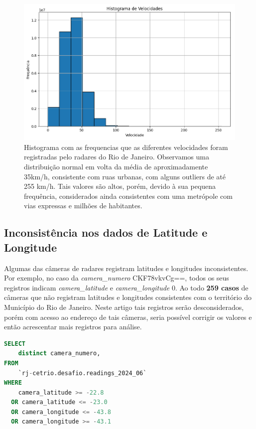 \documentclass{article}
\begin{document}
\begin{figure}
    \centering
    \includegraphics[width=0.75\linewidth]{histVelocidades.png}
    \caption{Histograma com as frequencias que as diferentes velocidades foram registradas pelo radares do Rio de Janeiro. Observamos uma distribuição normal em volta da média de aproximadamente 35km/h, consistente com ruas urbanas, com alguns outliers de até 255 km/h. Tais valores são altos, porém, devido à sua pequena frequência, considerados ainda consistentes com uma metrópole com vias expressas e milhões de habitantes.}
    \label{fig:histVelocidades}
\end{figure}

\subsection{Inconsistência nos dados de Latitude e Longitude}

Algumas das câmeras de radares registram latitudes e longitudes inconsistentes. Por exemplo, no caso da \textit{camera\_numero} CKF78vkvCg==, todos os seus registros indicam \textit{camera\_latitude} e \textit{camera\_longitude} 0. Ao todo \textbf{259 casos} de câmeras que não registram latitudes e longitudes consistentes com o território do Município do Rio de Janeiro. Neste artigo tais registros serão desconsiderados, porém com acesso ao endereço de tais câmeras, seria possível corrigir os valores e então acrescentar mais registros para análise.

\begin{lstlisting}[language=SQL,caption={Query SQL para identificar se existem casos inconsistentes onde câmeras registram valores de latitude e longitude fora do território do Município do Rio de Janeiro. Existem 259 casos de câmeras com problemas sistemáticos neste quesito.},label={lst:sqlquery2}]
SELECT 
    distinct camera_numero, 
FROM 
    `rj-cetrio.desafio.readings_2024_06`
WHERE 
    camera_latitude >= -22.8
  OR camera_latitude <= -23.0
  OR camera_longitude <= -43.8
  OR camera_longitude >= -43.1
\end{lstlisting}
\end{document}

